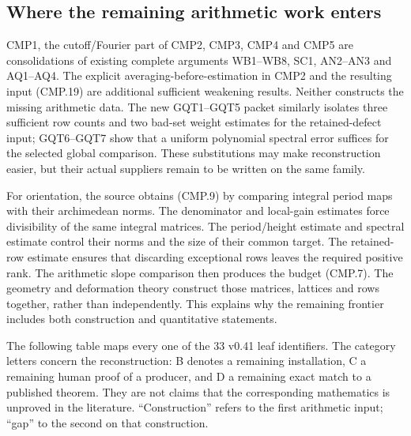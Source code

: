 \documentclass[11pt,a4paper]{article}
\numberwithin{equation}{section}
\theoremstyle{remark}\newtheorem{remark}[theorem]{Remark}
\begin{document}
\subsection{Where the remaining arithmetic work enters}

CMP1, the cutoff/Fourier part of CMP2, CMP3, CMP4 and CMP5 are
consolidations of existing complete arguments WB1--WB8, SC1,
AN2--AN3 and AQ1--AQ4.  The explicit averaging-before-estimation
in CMP2 and the resulting input (CMP.19) are additional sufficient
weakening results.  Neither constructs the missing arithmetic data.
The new GQT1--GQT5 packet similarly isolates three sufficient row
counts and two bad-set weight estimates for the retained-defect
input; GQT6--GQT7 show that a uniform polynomial spectral error
suffices for the selected global comparison.  These substitutions
may make reconstruction easier, but their actual suppliers remain
to be written on the same family.

For orientation, the source obtains (CMP.9) by comparing integral
period maps with their archimedean norms.  The denominator and
local-gain estimates force divisibility of the same integral
matrices.  The period/height estimate and spectral estimate control
their norms and the size of their common target.  The retained-row
estimate ensures that discarding exceptional rows leaves the
required positive rank.  The arithmetic slope comparison then
produces the budget (CMP.7).  The geometry and deformation theory
construct those matrices, lattices and rows together, rather than
independently.  This explains why the remaining frontier includes
both construction and quantitative statements.

The following table maps every one of the 33 v0.41 leaf identifiers.
The category letters concern the reconstruction: B denotes a
remaining installation, C a remaining human proof of a producer,
and D a remaining exact match to a published theorem.  They are
not claims that the corresponding mathematics is unproved in the
literature.  ``Construction'' refers to the first arithmetic input;
``gap'' to the second on that construction.
\end{document}
